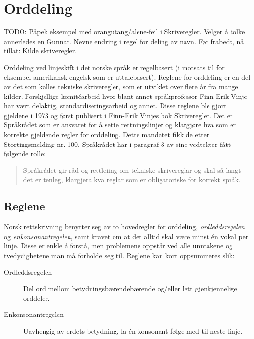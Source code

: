 \chapter{Orddeling}
\label{sec:orddeling}

TODO: Påpek eksempel med orangutang/alene-feil i Skriveregler. Velger å tolke annerledes en Gunnar.
Nevne endring i regel for deling av navn. Før frabedt, nå tillat: Kilde skriveregler.

Orddeling ved linjeskift i det norske språk er regelbasert (i motsats til for eksempel amerikansk-engelsk som er uttalebasert). Reglene for orddeling er en del av det som kalles tekniske skriveregler, som er utviklet over flere år fra mange kilder. Forskjellige komitéarbeid hvor blant annet språkprofessor Finn-Erik Vinje har vært delaktig, standardiseringsarbeid og annet.\cite{Simonsen2015} Disse reglene ble gjort gjeldene i 1973 og først publisert i Finn-Erik Vinjes bok Skriveregler. Det er Språkrådet som er ansvaret for å sette rettningslinjer og klargjøre hva som er korrekte gjeldende regler for orddeling. Dette mandatet fikk de etter Stortingsmelding nr. 100. Språkrådet har i paragraf 3 av sine vedtekter fått følgende rolle:

\begin{quote}
Språkrådet gir råd og rettleiing om tekniske skrivereglar og skal så langt det er tenleg, klargjera kva reglar som er obligatoriske for korrekt språk.
\end{quote}

\section{Reglene}
\label{sec:orddelingsreglene}

Norsk rettskrivning benytter seg av to hovedregler for orddeling, \textit{ordleddsregelen} og \textit{enkonsonantregelen}, samt kravet om at det alltid skal være minst én vokal per linje. Disse er enkle å forstå, men problemene oppstår ved alle unntakene og tvedydighetene man må forholde seg til. Reglene kan kort oppsummeres slik:

\begin{description}
	\item[Ordleddsregelen] Del ord mellom betydningsbærendebærende og/eller lett gjenkjennelige orddeler.
	\item[Enkonsonantregelen] Uavhengig av ordets betydning, la én konsonant følge med til neste linje.
\end{description}

